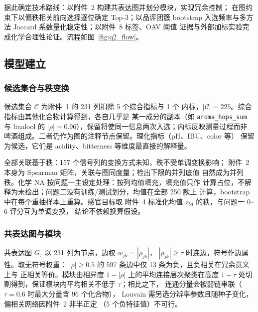\documentclass[12pt,a4paper]{article}
\begin{document}
据此确定技术路线：以附件~2 构建共表达图并划分模块，实现冗余控制；
在图约束下以偏秩相关前向选择逐位确定 Top-3；以品评团簇 bootstrap
入选频率与多方法 Jaccard 系数量化稳定性；以附件~8 标签、OAV 阈值
证据与外部加标实验完成化学合理性论证。流程如图~\ref{fig:q2_flow}。


\subsection{模型建立}

\subsubsection{候选集合与秩变换}

候选集合 $\mathcal C$ 为附件~1 的 231 列扣除 5 个综合指标与 1 个
内标，$|\mathcal C|=225$。综合指标由其他化合物计算得到，各自几乎是
某一成分的副本（如 \verb|aroma_hops_sum| 与 linalool 的
$|\rho|=0.96$），保留将使同一信息两次入选；内标反映测量过程而非
啤酒组成。二者仍作为图的注释节点保留。理化指标（pH、IBU、color 等）
保留为候选，它们是 acidity、bitterness 等维度最直接的解释量。

全部关联基于秩：157 个信号列的变换方式未知，秩不受单调变换影响；
附件~2 本身为 Spearman 矩阵，关联与图同度量；检出下限的并列底值
自然成为并列秩。化学 NA 按问题一主设定处理：按列均值填充，填充值只作
计算占位，不解释为未检出；问题二没有训练/测试划分，均值在全部 250 款上
计算，bootstrap 中在每个重抽样本上重算。感官目标取
附件~4 标准化均值 $z_{bd}$ 的秩，与问题一 0--6 评分互为单调变换，
结论不依赖换算假设。

\subsubsection{共表达图与模块}

共表达图 $G_\tau$ 以 231 列为节点，边权 $w_{jk}=|\rho_{jk}|$，
$|\rho_{jk}|\ge\tau$ 时连边，符号作边属性。取无符号权重：
$|\rho|\ge0.5$ 的 597 条边中仅 13 条为负，且负相关在冗余意义上与
正相关等价。模块由相异度 $1-|\rho|$ 上的平均连接层次聚类在高度
$1-\tau$ 处切割得到，保证模块内平均相关不低于 $\tau$；相比之下，
连通分量会被弱链串联（$\tau=0.6$ 时最大分量含 96 个化合物），
Louvain 需另选分辨率参数且随种子变化，偏相关网络因附件~2 非半正定
（5 个负特征值）不可行。
\end{document}
